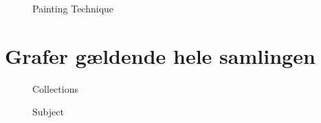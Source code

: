 {\begin{figure}[H]
    \setlength\fboxsep{0pt}
    \setlength\fboxrule{0.5pt}
    \centering
    \caption[]{Painting Technique}
    \label{painting_tech}
\end{figure}

\section{Grafer gældende hele samlingen}
\begin{figure}[H]
    \setlength\fboxsep{0pt}
    \setlength\fboxrule{0.5pt}
    \centering
    \caption[]{Collections}
    \label{collection_collection}
\end{figure}

\begin{figure}[H]
    \setlength\fboxsep{0pt}
    \setlength\fboxrule{0.5pt}
    \centering
    \caption[]{Subject}
    \label{collection_subject}
\end{figure}

}
